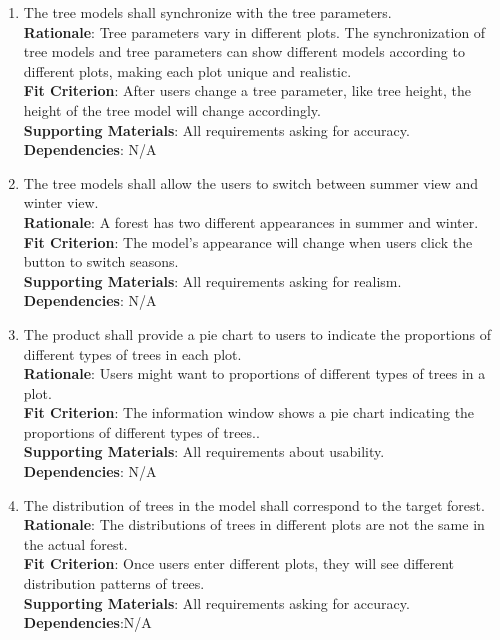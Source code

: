 \documentclass{article}
\begin{document}
\begin{enumerate}[FR1]
\item The tree models shall synchronize with the tree parameters.\\
\textbf{Rationale}: Tree parameters vary in different plots. The synchronization 
of tree models and tree parameters can show different models according to 
different plots, making each plot unique and realistic. \\
\textbf{Fit Criterion}: After users change a tree parameter, like tree height, the
height of the tree model will change accordingly. \\
\textbf{Supporting Materials}: All requirements asking for accuracy.\\
\textbf{Dependencies}: N/A\\

\item The tree models shall allow the users to switch between summer view and 
winter view.\\
\textbf{Rationale}: A forest has two different appearances in summer and winter. \\
\textbf{Fit Criterion}: The model's appearance will change when users click the 
button to switch seasons.\\
\textbf{Supporting Materials}: All requirements asking for realism.\\
\textbf{Dependencies}: N/A\\

\item The product shall provide a pie chart to users to indicate the proportions 
of different types of trees in each plot.\\
\textbf{Rationale}: Users might want to proportions of different types of trees in
a plot.\\
\textbf{Fit Criterion}: The information window shows a pie chart indicating the
proportions of different types of trees.. \\
\textbf{Supporting Materials}: All requirements about usability.\\
\textbf{Dependencies}: N/A\\

\item The distribution of trees in the model shall correspond to the target 
forest.\\
\textbf{Rationale}: The distributions of trees in different plots are not the same
in the actual forest.\\
\textbf{Fit Criterion}: Once users enter different plots, they will see different
distribution patterns of trees.\\
\textbf{Supporting Materials}: All requirements asking for accuracy.\\
\textbf{Dependencies}:N/A\\

\end{enumerate}
\end{document}
